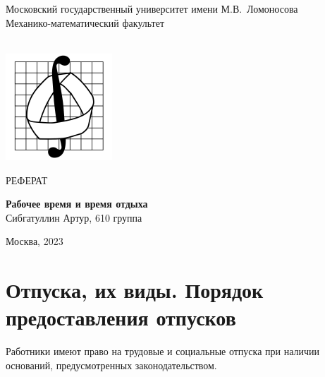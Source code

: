 \documentclass[14pt,a4paper]{extarticle}
\begin{document}
\begin{titlepage}


\begin{center}



{Московский государственный университет имени М.В.~Ломоносова}\\
Механико-математический факультет\\
\ \vspace{+2cm}


\includegraphics[width=0.3\textwidth]{mehmat.jpg}\\


\vspace{1cm}

{\large РЕФЕРАТ}

{\Large\bfseries
Рабочее время и время отдыха
\\}
{\large Сибгатуллин Артур, 610 группа}

\end{center}

\vspace{1cm}

\vspace{7cm}

\begin{center}
Москва, 2023
\end{center}


\enlargethispage{4\baselineskip}
\end{titlepage}

\newpage
\renewcommand{\contentsname}{Содержание}
\tableofcontents
\newpage



\section{Отпуска, их виды. Порядок предоставления отпусков}
Работники имеют право на трудовые и социальные отпуска при наличии оснований, предусмотренных законодательством.
\end{document}
